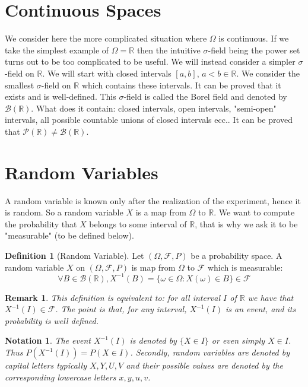 \documentclass[10pt,a4paper]{book}
\newtheorem*{remark}{Remark}
\newtheorem*{notation}{Notation}
\theoremstyle{definition}
\newtheorem{definition}{Definition}[section]
\begin{document}
\section{Continuous Spaces}
We consider here the more complicated situation where $\Omega$ is continuous. 
If we take the simplest example of $\Omega = \mathbb{R}$ then the intuitive $\sigma$-field being the power set turns out to be too complicated to be useful. We will instead consider a simpler $\sigma$-field on $\mathbb{R}$. We will start with closed intervals $[a,b]$, $a<b\in\mathbb{R}$. We consider the smallest $\sigma$-field on $\mathbb{R}$ which contains these intervals. It can be proved that it exists and is well-defined. This $\sigma$-field is called the Borel field and denoted by $\mathcal{B}(\mathbb{R})$. What does it contain: closed intervals, open intervals, "semi-open" intervals, all possible countable unions of closed intervals ecc..
It can be proved that $\mathcal{P}(\mathbb{R})\neq\mathcal{B}(\mathbb{R})$.

\section{Random Variables}
A random variable is known only after the realization of the experiment, hence it is random. So a random variable $X$ is a map from $\Omega$ to $\mathbb{R}$. We want to compute the probability that $X$ belongs to some interval of $\mathbb{R}$, that is why we ask it to be "measurable" (to be defined below).

\begin{definition}[Random Variable]
Let $(\Omega, \mathcal{F}, P)$ be a probability space. A random variable $X$ on $(\Omega, \mathcal{F}, P)$ is map from $\Omega$ to $\mathcal{F}$ which is measurable:
\[
\forall B \in \mathcal{B}(\mathbb{R}), X^{-1}(B) = \{ \omega \in \Omega : X(\omega) \in B \} \in \mathcal{F}
\]
\end{definition}

\begin{remark}
This definition is equivalent to: for all interval $I$ of $\mathbb{R}$ we have that $X^{-1}(I) \in \mathcal{F}$. The point is that, for any interval, $X^{-1}(I)$ is an event, and its probability is well defined. 
\end{remark}

\begin{notation}
The event $X^{-1}(I)$ is denoted by $\{X \in I\}$ or even simply $X \in I$. Thus $P(X^{-1}(I))=P(X\in I)$. Secondly, random variables are denoted by capital letters typically $X, Y, U, V$ and their possible values are denoted by the corresponding lowercase letters $x,y,u,v$.
\end{notation}
\end{document}
